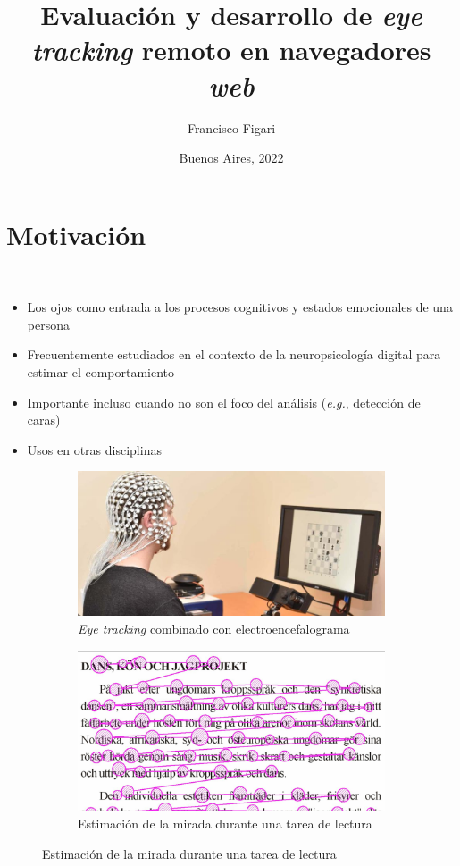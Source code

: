 \documentclass[aspectratio=169]{beamer}
\title{Evaluación y desarrollo de \textit{eye tracking} remoto en navegadores
\textit{web}}
\author{Francisco Figari}
\date{Buenos Aires, 2022}
\begin{document}
\frame{\titlepage}

\section{Motivación}

\begin{frame}{~}

  \begin{itemize}
      \item Los ojos como entrada a los procesos cognitivos y estados
        emocionales de una persona
      \item Frecuentemente estudiados en el contexto de la neuropsicología
        digital para estimar el comportamiento
      \item Importante incluso cuando no son el foco del análisis
        (\textit{e.g.}, detección de caras)
      \item Usos en otras disciplinas
  \end{itemize}

  \begin{figure}
    \begin{subfigure}{0.49\textwidth}
      \centering
      \includegraphics[width=\linewidth]{img/eye-link-eeg.jpg}
      \caption{\textit{Eye tracking} combinado con electroencefalograma}
    \end{subfigure}
    \begin{subfigure}{0.49\textwidth}
      \centering
      \includegraphics[width=\linewidth]{img/reading-fixations-saccades.jpg}
      \caption{Estimación de la mirada durante una tarea de lectura}
    \end{subfigure}
  \end{figure}

\end{frame}
\end{document}
